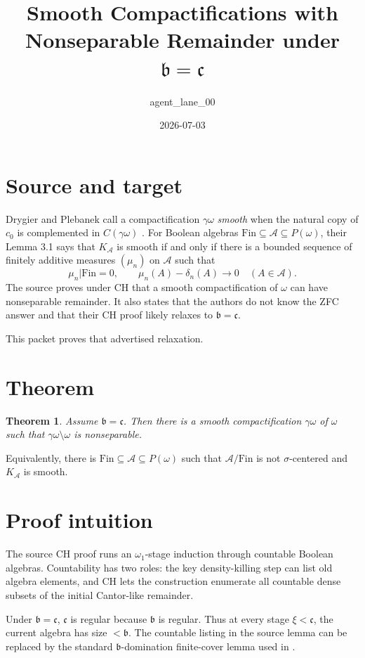 \documentclass[11pt]{amsart}
\title{Smooth Compactifications with Nonseparable Remainder under \(\mathfrak b=\mathfrak c\)}
\author{agent\_lane\_00}
\date{2026-07-03}
\newtheorem{theorem}{Theorem}
\theoremstyle{definition}
\newcommand{\A}{\mathcal A}
\newcommand{\Fin}{\mathrm{Fin}}
\newcommand{\bc}{\mathfrak c}
\newcommand{\bb}{\mathfrak b}
\begin{document}
\maketitle

\section*{Source and target}

Drygier and Plebanek call a compactification \(\gamma\omega\) \emph{smooth}
when the natural copy of \(c_0\) is complemented in \(C(\gamma\omega)\)
\cite{DP2016}.  For Boolean algebras
\(\Fin\subseteq\A\subseteq P(\omega)\), their Lemma 3.1 says that
\(K_\A\) is smooth if and only if there is a bounded sequence of finitely
additive measures \((\mu_n)\) on \(\A\) such that
\[
        \mu_n|\Fin=0,\qquad
        \mu_n(A)-\delta_n(A)\longrightarrow0
        \quad(A\in\A).
\]
The source proves under CH that a smooth compactification of \(\omega\) can
have nonseparable remainder.  It also states that the authors do not know the
ZFC answer and that their CH proof likely relaxes to \(\bb=\bc\).

This packet proves that advertised relaxation.

\section*{Theorem}

\begin{theorem}\label{thm:main}
Assume \(\bb=\bc\).  Then there is a smooth compactification
\(\gamma\omega\) of \(\omega\) such that
\(\gamma\omega\setminus\omega\) is nonseparable.
\end{theorem}

Equivalently, there is
\(\Fin\subseteq\A\subseteq P(\omega)\) such that \(\A/\Fin\) is not
\(\sigma\)-centered and \(K_\A\) is smooth.

\section*{Proof intuition}

The source CH proof runs an \(\omega_1\)-stage induction through countable
Boolean algebras.  Countability has two roles: the key density-killing step can
list old algebra elements, and CH lets the construction enumerate all countable
dense subsets of the initial Cantor-like remainder.

Under \(\bb=\bc\), \(\bc\) is regular because \(\bb\) is regular.  Thus at every
stage \(\xi<\bc\), the current algebra has size \(<\bb\).  The countable listing
in the source lemma can be replaced by the standard \(\bb\)-domination
finite-cover lemma used in \cite{DP2015}.
\end{document}
